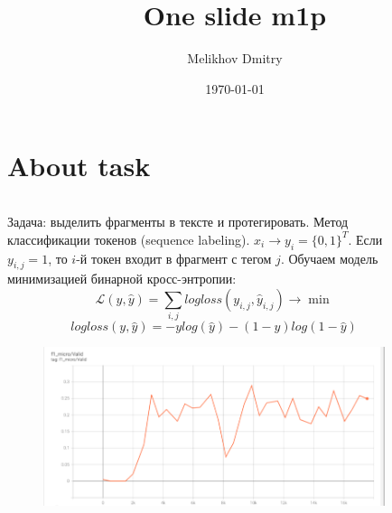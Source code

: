 \documentclass[9pt,pdf,hyperref={unicode}]{beamer}
\title[One slide m1p]{One slide m1p}
\author{Melikhov Dmitry}
\institute[]{MSU}
\date[2022]{\today}
\begin{document}


\section{About task}
\begin{frame}{}
\begin{columns}
\begin{column}{0.4\textwidth}
    Задача: выделить фрагменты в тексте и протегировать.
    Метод классификации токенов (sequence labeling).
    $x_i \rightarrow y_i = \{0, 1\}^T$. Если $y_{i, j} = 1$, то $i$-й токен входит в фрагмент с тегом $j$.
    Обучаем модель минимизацией бинарной кросс-энтропии:
    $$
    \mathcal{L}(y, \hat{y}) = \sum_{i, j} logloss(y_{i, j}, \hat{y}_{i, j}) \rightarrow \min
    $$
    $$
    logloss(y, \hat{y}) = - y log(\hat{y}) - (1 - y) log(1 - \hat{y})
    $$
    \begin{figure}
        \centering
        \includegraphics[width=1.2\textwidth]{f1_score.png}
    \end{figure}
\end{column}
\begin{column}{0.5\textwidth}
    \begin{figure}
        \centering
        
    \end{figure}
\end{column}
\end{columns}


\end{frame}
\end{document}
